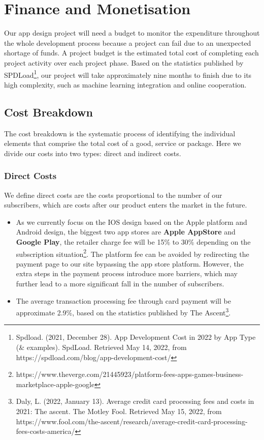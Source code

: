 \section{Finance and Monetisation}
\label{sec:Finance and Monetisation}
Our app design project will need a budget to monitor the expenditure throughout the whole development process because a project can fail due to an unexpected shortage of funds. A project budget is the estimated total cost of completing each project activity over each project phase. Based on the statistics published by SPDLoad\footnote{Spdload. (2021, December 28). App Development Cost in 2022 by App Type (\& examples). SpdLoad. Retrieved May 14, 2022, from https://spdload.com/blog/app-development-cost/}, our project will take approximately nine months to finish due to its high complexity, such as machine learning integration and online cooperation.
\subsection{Cost Breakdown}
The cost breakdown is the systematic process of identifying the individual elements that comprise the total cost of a good, service or package. Here we divide our costs into two types: direct and indirect costs.
\subsubsection{Direct Costs}
We define direct costs are the costs proportional to the number of our subscribers, which are costs after our product enters the market in the future.
\begin{itemize}
\item As we currently focus on the IOS design based on the Apple platform and Android design, the biggest two app stores are \textbf{Apple AppStore} and \textbf{Google Play}, the retailer charge fee will be 15\% to 30\% depending on the subscription situation\footnote{https://www.theverge.com/21445923/platform-fees-apps-games-business-marketplace-apple-google}. The platform fee can be avoided by redirecting the payment page to our site bypassing the app store platform. However, the extra steps in the payment process introduce more barriers, which may further lead to a more significant fall in the number of subscribers.
\item The average transaction processing fee through card payment will be approximate 2.9\%, based on the statistics published by The Ascent\footnote{Daly, L. (2022, January 13). Average credit card processing fees and costs in 2021: The ascent. The Motley Fool. Retrieved May 15, 2022, from https://www.fool.com/the-ascent/research/average-credit-card-processing-fees-costs-america/}.
\end{itemize}



